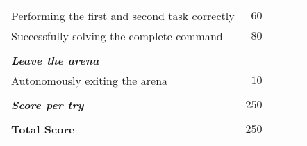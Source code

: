 \begin{tabularx}{\textwidth}{X r c c c }
	Performing the first and second task correctly & $60$ & \hrulefill & \hrulefill & \hrulefill \\
	Successfully solving the complete command & $80$ & \hrulefill & \hrulefill & \hrulefill \\
	& & & & \\ 
	\textit{\textbf{Leave the arena}} \\
	Autonomously exiting the arena & $10$ & \hrulefill & \hrulefill & \hrulefill \\ \hline
	& & & & \\ 
	\textit{\textbf{Score per try}} & $250$ & \hrulefill & \hrulefill & \hrulefill \\ 
	& & & & \\ 
	\textbf{Total Score} & $250$ & & & \\ \cline{3-5}

\end{tabularx}\\

